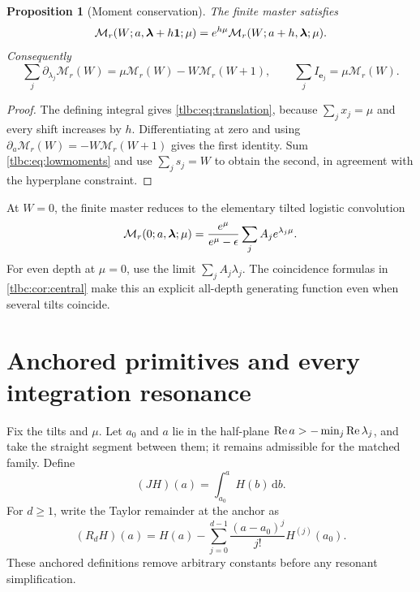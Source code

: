 \documentclass[11pt,letterpaper]{article}
\numberwithin{equation}{section}
\newtheorem{proposition}[theorem]{Proposition}
\theoremstyle{definition}\newtheorem{definition}[theorem]{Definition}
\theoremstyle{remark}\newtheorem{remark}[theorem]{Remark}
\newcommand{\dd}{\,\mathrm d}\newcommand{\ii}{\mathrm i}
\newcommand{\M}{\mathcal M}\newcommand{\T}{\mathcal T}\newcommand{\K}{\mathcal K}
\begin{document}
\begin{proposition}[Moment conservation]\label{tlbc:prop:conservation}
The finite master satisfies
\begin{equation}\label{tlbc:eq:translation}
 \M_r(W;a,\bl+h\mathbf1;\mu)
 =e^{h\mu}\M_r(W;a+h,\bl;\mu).
\end{equation}
Consequently
\begin{equation}\label{tlbc:eq:conservation}
 \sum_j\partial_{\lambda_j}\M_r(W)
 =\mu\M_r(W)-W\M_r(W+1),\qquad
 \sum_j I_{\mathbf e_j}=\mu\M_r(W).
\end{equation}
\end{proposition}
\begin{proof}
The defining integral gives \eqref{tlbc:eq:translation}, because $\sum_jx_j=\mu$ and every shift increases by $h$. Differentiating at zero and using
$\partial_a\M_r(W)=-W\M_r(W+1)$ gives the first identity. Sum \eqref{tlbc:eq:lowmoments} and use $\sum_js_j=W$ to obtain the second, in agreement with the hyperplane constraint.
\end{proof}
At $W=0$, the finite master reduces to the elementary tilted logistic convolution
\begin{equation}\label{tlbc:eq:logistic}
 \M_r(0;a,\bl;\mu)
 =\frac{e^\mu}{e^\mu-\epsilon}\sum_j A_je^{\lambda_j\mu}.
\end{equation}
For even depth at $\mu=0$, use the limit $\sum_j A_j\lambda_j$. The coincidence formulas in \cref{tlbc:cor:central} make this an explicit all-depth generating function even when several tilts coincide.

\section{Anchored primitives and every integration resonance}
\label{tlbc:sec:primitives}
Fix the tilts and $\mu$. Let $a_0$ and $a$ lie in the half-plane
$\operatorname{Re} a> -\min_j\operatorname{Re}\lambda_j$, and take the straight segment between them; it remains admissible for the matched family. Define
\[
 (JH)(a)=\int_{a_0}^a H(b)\dd b.
\]
For $d\ge1$, write the Taylor remainder at the anchor as
\begin{equation}\label{tlbc:eq:remainder}
 (R_dH)(a)=H(a)-\sum_{j=0}^{d-1}\frac{(a-a_0)^j}{j!}H^{(j)}(a_0).
\end{equation}
These anchored definitions remove arbitrary constants before any resonant simplification.
\end{document}
